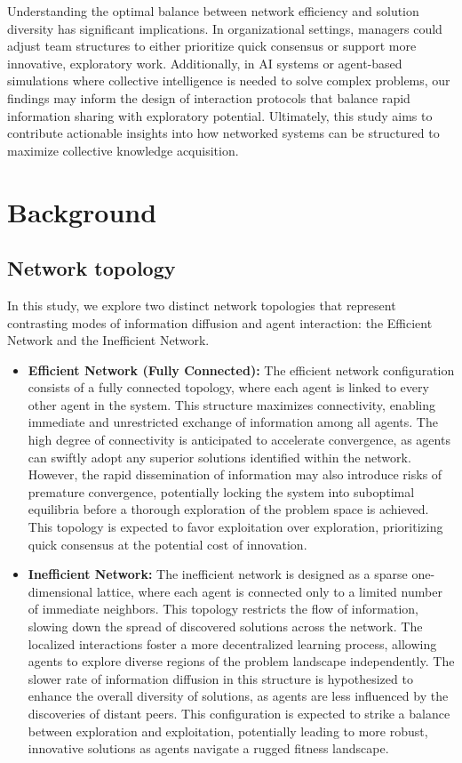 \documentclass[conference]{IEEEtran}
\begin{document}
Understanding the optimal balance between network efficiency and solution diversity has significant implications. In organizational settings, managers could adjust team structures to either prioritize quick consensus or support more innovative, exploratory work. Additionally, in AI systems or agent-based simulations where collective intelligence is needed to solve complex problems, our findings may inform the design of interaction protocols that balance rapid information sharing with exploratory potential. Ultimately, this study aims to contribute actionable insights into how networked systems can be structured to maximize collective knowledge acquisition.

\section{Background}

\subsection{Network topology}

In this study, we explore two distinct network topologies that represent contrasting modes of information diffusion and agent interaction: the Efficient Network and the Inefficient Network.

\begin{itemize}
    \item \textbf{Efficient Network (Fully Connected):} The efficient network configuration consists of a fully connected topology, where each agent is linked to every other agent in the system. This structure maximizes connectivity, enabling immediate and unrestricted exchange of information among all agents. The high degree of connectivity is anticipated to accelerate convergence, as agents can swiftly adopt any superior solutions identified within the network. However, the rapid dissemination of information may also introduce risks of premature convergence, potentially locking the system into suboptimal equilibria before a thorough exploration of the problem space is achieved. This topology is expected to favor exploitation over exploration, prioritizing quick consensus at the potential cost of innovation.
    \item \textbf{Inefficient Network:} The inefficient network is designed as a sparse one-dimensional lattice, where each agent is connected only to a limited number of immediate neighbors. This topology restricts the flow of information, slowing down the spread of discovered solutions across the network. The localized interactions foster a more decentralized learning process, allowing agents to explore diverse regions of the problem landscape independently. The slower rate of information diffusion in this structure is hypothesized to enhance the overall diversity of solutions, as agents are less influenced by the discoveries of distant peers. This configuration is expected to strike a balance between exploration and exploitation, potentially leading to more robust, innovative solutions as agents navigate a rugged fitness landscape.
\end{itemize}
\end{document}
